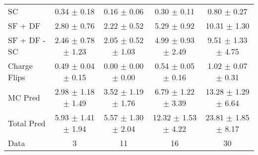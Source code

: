 \begin{tabular}{l|cccc}
                                 SC &  0.34 $\pm$  0.18 &  0.16 $\pm$  0.06 &  0.30 $\pm$  0.11 &  0.80 $\pm$  0.27 \\
                            SF + DF &  2.80 $\pm$  0.76 &  2.22 $\pm$  0.52 &  5.29 $\pm$  0.92 & 10.31 $\pm$  1.30 \\
\hline
                       SF + DF - SC &  2.46 $\pm$  0.78 $\pm$  1.23 &  2.05 $\pm$  0.52 $\pm$  1.03 &  4.99 $\pm$  0.93 $\pm$  2.49 &  9.51 $\pm$  1.33 $\pm$  4.75 \\
\hline\hline
                       Charge Flips &  0.49 $\pm$  0.04 $\pm$  0.15 &  0.00 $\pm$  0.00 $\pm$  0.00 &  0.54 $\pm$  0.05 $\pm$  0.16 &  1.02 $\pm$  0.07 $\pm$  0.31 \\
\hline
                            MC Pred &  2.98 $\pm$  1.18 $\pm$  1.49 &  3.52 $\pm$  1.19 $\pm$  1.76 &  6.79 $\pm$  1.22 $\pm$  3.39 & 13.28 $\pm$  1.29 $\pm$  6.64 \\
\hline
                         Total Pred &  5.93 $\pm$  1.41 $\pm$  1.94 &  5.57 $\pm$  1.30 $\pm$  2.04 & 12.32 $\pm$  1.53 $\pm$  4.22 & 23.81 $\pm$  1.85 $\pm$  8.17 \\
\hline\hline
                               Data &     3 &    11 &    16 &    30 \\
\hline\hline
\end{tabular}


